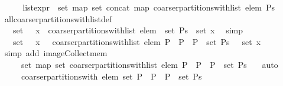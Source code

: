 \begin{isabellebody}
\isamarkupfalse%
\ {\isacharminus}\isanewline
\ \ \isamarkupfalse%
\ {\isachardoublequoteopen}{\isacharquery}list{\isacharunderscore}expr\ {\isacharequal}\ set\ {\isacharparenleft}map\ set\ {\isacharparenleft}concat\ {\isacharparenleft}map\ {\isacharparenleft}coarser{\isacharunderscore}partitions{\isacharunderscore}with{\isacharunderscore}list\ elem{\isacharparenright}\ Ps{\isacharparenright}{\isacharparenright}{\isacharparenright}{\isachardoublequoteclose}\isanewline
\ \ \ \ \isamarkupfalse%
\ all{\isacharunderscore}coarser{\isacharunderscore}partitions{\isacharunderscore}with{\isacharunderscore}list{\isacharunderscore}def\ \isacommand{{\isachardot}{\isachardot}}\isamarkupfalse%
\isanewline
\ \ \isamarkupfalse%
\ \isamarkupfalse%
\ {\isachardoublequoteopen}{\isasymdots}\ {\isacharequal}\ set\ {\isacharbackquote}\ {\isacharparenleft}{\isasymUnion}\ x\ {\isasymin}\ {\isacharparenleft}coarser{\isacharunderscore}partitions{\isacharunderscore}with{\isacharunderscore}list\ elem{\isacharparenright}\ {\isacharbackquote}\ {\isacharparenleft}set\ Ps{\isacharparenright}\ {\isachardot}\ set\ x{\isacharparenright}{\isachardoublequoteclose}\ \isamarkupfalse%
\ simp\isanewline
\ \ \isamarkupfalse%
\ \isamarkupfalse%
\ {\isachardoublequoteopen}{\isasymdots}\ {\isacharequal}\ set\ {\isacharbackquote}\ {\isacharparenleft}{\isasymUnion}\ x\ {\isasymin}\ {\isacharbraceleft}\ coarser{\isacharunderscore}partitions{\isacharunderscore}with{\isacharunderscore}list\ elem\ P\ {\isacharbar}\ P\ {\isachardot}\ P\ {\isasymin}\ set\ Ps\ {\isacharbraceright}\ {\isachardot}\ set\ x{\isacharparenright}{\isachardoublequoteclose}\isanewline
\ \ \ \ \isamarkupfalse%
\ {\isacharparenleft}simp\ add{\isacharcolon}\ image{\isacharunderscore}Collect{\isacharunderscore}mem{\isacharparenright}\isanewline
\ \ \isamarkupfalse%
\ \isamarkupfalse%
\ {\isachardoublequoteopen}{\isasymdots}\ {\isacharequal}\ {\isasymUnion}\ {\isacharbraceleft}\ set\ {\isacharparenleft}map\ set\ {\isacharparenleft}coarser{\isacharunderscore}partitions{\isacharunderscore}with{\isacharunderscore}list\ elem\ P{\isacharparenright}{\isacharparenright}\ {\isacharbar}\ P\ {\isachardot}\ P\ {\isasymin}\ set\ Ps\ {\isacharbraceright}{\isachardoublequoteclose}\ \isamarkupfalse%
\ auto\isanewline
\ \ \isamarkupfalse%
\ \isamarkupfalse%
\ {\isachardoublequoteopen}{\isasymdots}\ {\isacharequal}\ {\isasymUnion}\ {\isacharbraceleft}\ coarser{\isacharunderscore}partitions{\isacharunderscore}with\ elem\ {\isacharparenleft}set\ P{\isacharparenright}\ {\isacharbar}\ P\ {\isachardot}\ P\ {\isasymin}\ set\ Ps\ {\isacharbraceright}{\isachardoublequoteclose}\isanewline

\end{isabellebody}
